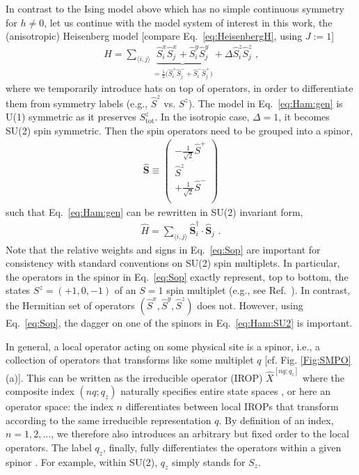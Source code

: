 \documentclass[aps,prx,twocolumn,showpacs,psfig,superscriptaddress,longbibliography]{revtex4-1}
\newcommand{\Eq}[1]{Eq.~\eqref{#1}}
\def\Sztot{S^z_{\mathrm{tot}}}
\begin{document}
In contrast to the Ising model above which has no simple continuous
symmetry for $h\neq0$, let us continue with the model system of
interest in this work, the (anisotropic) Heisenberg model
[compare \Eq{eq:HeisenbergH}, using $J:=1$]
%
\begin{eqnarray}
   \hat{H} = \sum_{\langle i,j \rangle}
   \underset{= \tfrac{1}{2}
     \bigl( \hat{S}^+_i \hat{S}^-_{j} + \hat{S}^-_i \hat{S}^+_{j}
   \bigr)}{
   \underbrace{\hat{S}^x_i \hat{S}^x_{j} + \hat{S}^y_i \hat{S}^y_{j}}
   } + 
   \Delta %
   \hat{S}^z_i \hat{S}^z_{j}
\text{ ,}\label{eq:Ham:gen}
\end{eqnarray}
%
where we temporarily introduce hats on top of operators, in order to
differentiate them from symmetry labels (e.g., $\hat{S}^z$ vs.
$S^z$).  The model in \Eq{eq:Ham:gen} is U(1) symmetric as it
preserves $\Sztot$. In the isotropic case, $\Delta=1$, %
it becomes SU(2)
spin symmetric.  Then the spin operators need to be grouped into a
spinor,
%
\begin{eqnarray}
   \mathbf{\hat{S}} \equiv \left(
      \begin{array}{c}
         -\tfrac{1}{\sqrt{2}} \hat{S}^+ \\
          \hat{S}^z \\
         +\tfrac{1}{\sqrt{2}} \hat{S}^- \\
      \end{array}
   \right)
\label{eq:Sop}
\end{eqnarray}
such that \Eq{eq:Ham:gen} can be rewritten
in SU(2) invariant form, 
\begin{eqnarray}
   \hat{H} = \sum_{\langle i,j \rangle}
   \mathbf{\hat{S}}_i^\dagger \cdot \mathbf{\hat{S}}_j
\text{ .}\label{eq:Ham:SU2}
\end{eqnarray}
%
Note that the relative weights and signs in \Eq{eq:Sop} are
important for consistency with standard conventions on SU(2) spin
multiplets.  In particular, the operators in the spinor in
\Eq{eq:Sop} exactly represent, top to bottom, the states
$S^z=(+1,0,-1)$ of an $S=1$ spin multiplet (e.g., see
Ref.~\cite{Weichselbaum.a:2012:QSpace}).  In contrast, the Hermitian
set of operators $(\hat{S}^x,\hat{S}^y, \hat{S}^z)$ does not.
However, using \Eq{eq:Sop}, the dagger on one of the spinors in
\Eq{eq:Ham:SU2} is important.

In general, a local operator acting on some physical site is a
spinor, i.e., a collection of operators that transforms like some
multiplet $q$ [cf. Fig.  \ref{Fig:SMPO}(a)].  This can be written as
the irreducible operator (IROP) $\hat{X}^{[nq;q_z]}$ where the
composite index $(nq;q_z)$ naturally specifies entire state spaces
\cite{Weichselbaum.a:2012:QSpace}, or here an operator space: the
index $n$ differentiates between local IROPs that transform
according to the same irreducible representation $q$. By definition
of an index, $n=1,2,\ldots$, we therefore also introduces an
arbitrary but fixed order to the local operators.  The label $q_z$,
finally, fully differentiates the operators within a given spinor
\cite{Weichselbaum.a:2012:QSpace}.  For example, within SU(2), $q_z$
simply stands for $S_z$.
\end{document}
